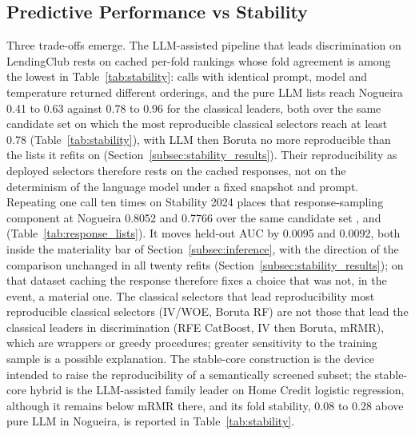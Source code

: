 \documentclass[final,5p,twocolumn]{elsarticle}
\providecommand{\DIFaddtex}[1]{{\protect\color{blue} \sf #1}} %
\providecommand{\DIFdeltex}[1]{{\protect\color{red} \scriptsize #1}} %
\providecommand{\DIFaddbegin}{} %
\providecommand{\DIFaddend}{} %
\providecommand{\DIFdelbegin}{} %
\providecommand{\DIFdelend}{} %
\providecommand{\DIFadd}[1]{\texorpdfstring{\DIFaddtex{#1}}{#1}} %
\providecommand{\DIFdel}[1]{\texorpdfstring{\DIFdeltex{#1}}{}} %
\begin{document}
\subsection{Predictive Performance vs Stability}
\label{subsec:performance_vs_stability}

Three trade-offs emerge. The LLM-assisted pipeline that leads discrimination on LendingClub rests on cached per-fold rankings whose fold agreement is among the lowest in Table~\ref{tab:stability}: calls with identical prompt, model and temperature returned different orderings, and the pure LLM lists reach Nogueira 0.41 to 0.63 \DIFdelbegin \DIFdel{against 0.78 to 0.96 for the classical leaders, both }\DIFdelend over the same candidate set \DIFaddbegin \DIFadd{on which the most reproducible classical selectors reach at least 0.78 (Table~\ref{tab:stability})}\DIFaddend , with LLM then Boruta no more reproducible than the lists it refits on (Section~\ref{subsec:stability_results}). Their reproducibility as deployed selectors therefore rests on the cached responses, not on the determinism of the language model under a fixed snapshot and prompt. Repeating one call ten times on Stability 2024 places that response-sampling component at Nogueira 0.8052 and 0.7766 over the same candidate set \DIFdelbegin \DIFdel{, and }\DIFdelend \DIFaddbegin \DIFadd{(Table~\ref{tab:response_lists}). It }\DIFaddend moves held-out AUC by 0.0095 and 0.0092, both inside the materiality bar of Section~\ref{subsec:inference}, with the direction of the comparison unchanged in all twenty refits (Section~\ref{subsec:stability_results}); on that dataset caching the response therefore fixes a choice that was not, in the event, a material one. The \DIFdelbegin \DIFdel{classical selectors that lead reproducibility }\DIFdelend \DIFaddbegin \DIFadd{most reproducible classical selectors }\DIFaddend (IV/WOE, Boruta RF) are not \DIFdelbegin \DIFdel{those that lead }\DIFdelend \DIFaddbegin \DIFadd{the classical leaders in }\DIFaddend discrimination (RFE CatBoost, IV then Boruta, mRMR), which are wrappers or greedy procedures; greater sensitivity to the training sample is a possible explanation. The stable-core construction is the device intended to raise the reproducibility of a semantically screened subset; the stable-core hybrid is the LLM-assisted family leader on Home Credit logistic regression, although it remains below mRMR there, and its fold stability, 0.08 to 0.28 above pure LLM in Nogueira, is reported in Table~\ref{tab:stability}.
\DIFaddbegin 
\end{document}
